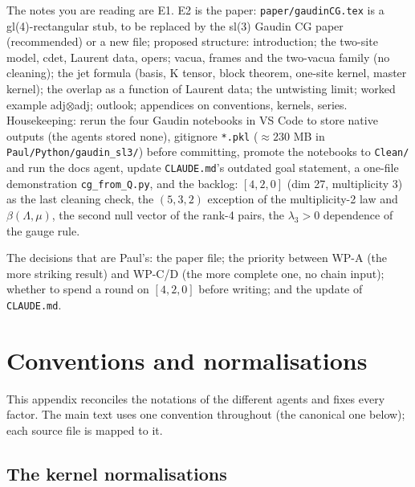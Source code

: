 \documentclass[11pt]{article}
\begin{document}
The notes you are reading are E1.
E2 is the paper: \texttt{paper/\allowbreak{}gaudinCG.\allowbreak{}tex} is a gl(4)-rectangular stub, to be replaced by the sl(3) Gaudin CG paper (recommended) or a new file; proposed structure: introduction; the two-site model, cdet, Laurent data, opers; vacua, frames and the two-vacua family (no cleaning); the jet formula (basis, K tensor, block theorem, one-site kernel, master kernel); the overlap as a function of Laurent data; the untwisting limit; worked example adj$\otimes$adj; outlook; appendices on conventions, kernels, series.
Housekeeping: rerun the four Gaudin notebooks in VS Code to store native outputs (the agents stored none), gitignore \texttt{*.\allowbreak{}pkl} ($\approx230$ MB in \texttt{Paul/\allowbreak{}Python/\allowbreak{}gaudin\_\allowbreak{}sl3/\allowbreak{}}) before committing, promote the notebooks to \texttt{Clean/\allowbreak{}} and run the docs agent, update \texttt{CLAUDE.\allowbreak{}md}'s outdated goal statement, a one-file demonstration \texttt{cg\_\allowbreak{}from\_\allowbreak{}Q.\allowbreak{}py}, and the backlog: $[4,2,0]$ (dim 27, multiplicity 3) as the last cleaning check, the $(5,3,2)$ exception of the multiplicity-2 law and $\beta(\Lambda,\mu)$, the second null vector of the rank-4 pairs, the $\lambda_3>0$ dependence of the gauge rule.

The decisions that are Paul's: the paper file; the priority between WP-A (the more striking result) and WP-C/D (the more complete one, no chain input); whether to spend a round on $[4,2,0]$ before writing; and the update of \texttt{CLAUDE.\allowbreak{}md}.

\appendix

\section{Conventions and normalisations}\label{app:conv}

This appendix reconciles the notations of the different agents and fixes every factor.
The main text uses one convention throughout (the canonical one below); each source file is mapped to it.

\subsection{The kernel normalisations}\label{app:norm}
\end{document}
